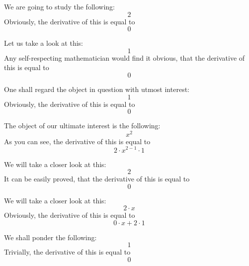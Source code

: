 \documentclass{article}
\begin{document}
We are going to study the following:
\begin{equation}
2 
\end{equation}
Obviously, the derivative of this is equal to
\begin{equation}
0 
\end{equation}

Let us take a look at this:
\begin{equation}
1 
\end{equation}
Any self-respecting mathematician would find it obvious, that the derivative of this is equal to
\begin{equation}
0 
\end{equation}

One shall regard the object in question with utmost interest:
\begin{equation}
1 
\end{equation}
Obviously, the derivative of this is equal to
\begin{equation}
0 
\end{equation}

The object of our ultimate interest is the following:
\begin{equation}
x ^{2 } 
\end{equation}
As you can see, the derivative of this is equal to
\begin{equation}
2 \cdot x ^{2 - 1 } \cdot 1 
\end{equation}

We will take a closer look at this:
\begin{equation}
2 
\end{equation}
It can be easily proved, that the derivative of this is equal to
\begin{equation}
0 
\end{equation}

We will take a closer look at this:
\begin{equation}
2 \cdot x 
\end{equation}
Obviously, the derivative of this is equal to
\begin{equation}
0 \cdot x + 2 \cdot 1 
\end{equation}

We shall ponder the following:
\begin{equation}
1 
\end{equation}
Trivially, the derivative of this is equal to
\begin{equation}
0 
\end{equation}
\end{document}
